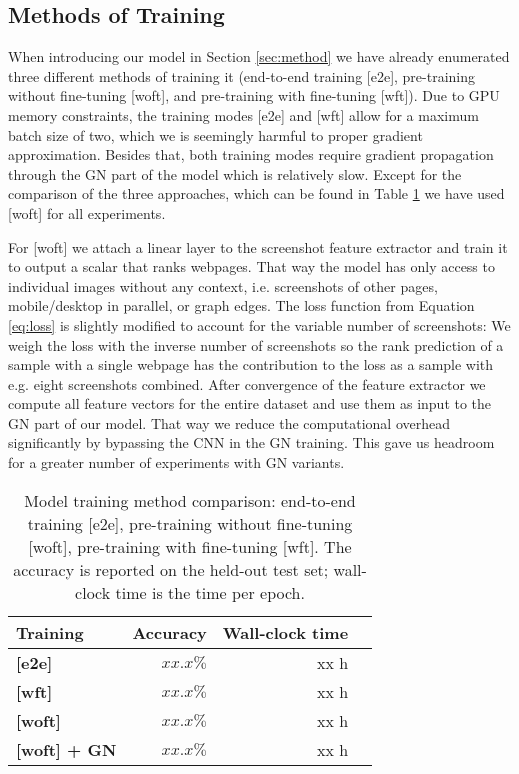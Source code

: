 \subsection{Methods of Training}

When introducing our model in Section \ref{sec:method} we have already enumerated three different methods of training it (end-to-end training [e2e], pre-training without fine-tuning [woft], and pre-training with fine-tuning [wft]). Due to GPU memory constraints, the training modes [e2e] and [wft] allow for a maximum batch size of two, which we is seemingly harmful to proper gradient approximation. Besides that, both training modes require gradient propagation through the GN part of the model which is relatively slow. Except for the comparison of the three approaches, which can be found in Table \ref{tab:trainmethodcomparison} we have used [woft] for all experiments.

For [woft] we attach a linear layer to the screenshot feature extractor and train it to output a scalar that ranks webpages. That way the model has only access to individual images without any context, i.e. screenshots of other pages, mobile/desktop in parallel, or graph edges. The loss function from Equation \ref{eq:loss} is slightly modified to account for the variable number of screenshots: We weigh the loss with the inverse number of screenshots so the rank prediction of a sample with a single webpage has the contribution to the loss as a sample with e.g. eight screenshots combined. After convergence of the feature extractor we compute all feature vectors for the entire dataset and use them as input to the GN part of our model. That way we reduce the computational overhead significantly by bypassing the CNN in the GN training. This gave us headroom for a greater number of experiments with GN variants.

\begin{table}
    \centering
    \begin{tabular}{lrrr}
        \textbf{Training} & \textbf{Accuracy} & \textbf{Wall-clock time}\\\hline
        \textbf{[e2e]} & $xx.x\%$ & xx h\\
        \textbf{[wft]} & $xx.x\%$ & xx h\\
        \textbf{[woft]} & $xx.x\%$ & xx h\\
        \textbf{[woft] + GN} & $xx.x\%$ & xx h\\
    \end{tabular}
    \caption[Model training method comparison]{Model training method comparison: end-to-end training [e2e], pre-training without fine-tuning [woft], pre-training with fine-tuning [wft]. The accuracy is reported on the held-out test set; wall-clock time is the time per epoch.}
    \label{tab:trainmethodcomparison}
\end{table}

